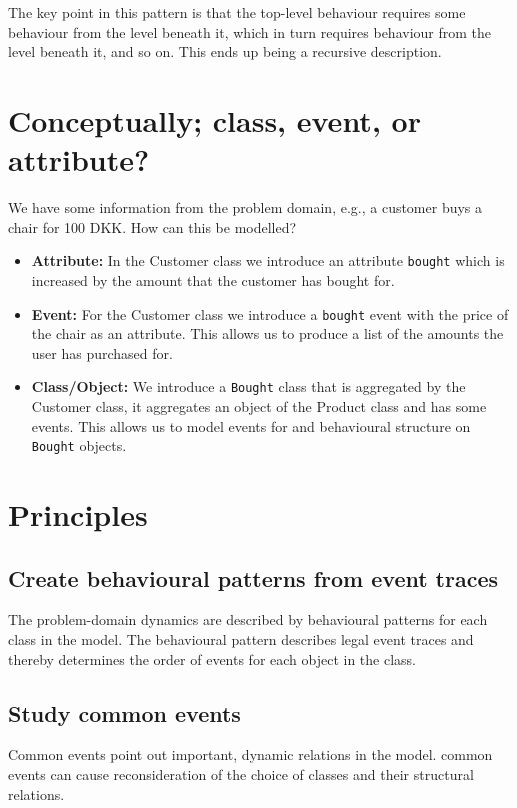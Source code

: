 The key point in this pattern is that the top-level behaviour requires some behaviour from the level beneath it, which in turn requires behaviour from the level beneath it, and so on. This ends up being a recursive description. 

\section{Conceptually; class, event, or attribute?}
We have some information from the problem domain, e.g., a customer buys a chair for 100 DKK. How can this be modelled?

\begin{itemize}
    \item \textbf{Attribute:} In the Customer class we introduce an attribute \texttt{bought} which is increased by the amount that the customer has bought for.
    \item \textbf{Event:} For the Customer class we introduce a \texttt{bought} event with the price of the chair as an attribute. This allows us to produce a list of the amounts the user has purchased for.
    \item \textbf{Class/Object:} We introduce a \texttt{Bought} class that is aggregated by the Customer class, it aggregates an object of the Product class and has some events. This allows us to model events for and behavioural structure on \texttt{Bought} objects.
\end{itemize}

\section{Principles}
\subsection{Create behavioural patterns from event traces}
The problem-domain dynamics are described by behavioural patterns for each class in the model. The behavioural pattern describes legal event traces and thereby determines the order of events for each object in the class.

\subsection{Study common events}
Common events point out important, dynamic relations in the model. common events can cause reconsideration of the choice of classes and their structural relations.

